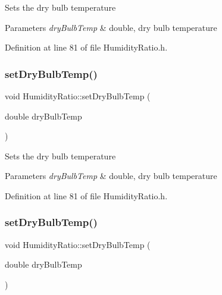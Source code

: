 Sets the dry bulb temperature


\begin{DoxyParams}{Parameters}
{\em dry\+Bulb\+Temp} & double, dry bulb temperature \\
\hline
\end{DoxyParams}


Definition at line 81 of file Humidity\+Ratio.\+h.

\mbox{\label{class_humidity_ratio_a291bccce6b8665412987a31bd2633d9a}} 
\subsubsection{\texorpdfstring{set\+Dry\+Bulb\+Temp()}{setDryBulbTemp()}\hspace{0.1cm}{\footnotesize\ttfamily [2/3]}}
{\footnotesize\ttfamily void Humidity\+Ratio\+::set\+Dry\+Bulb\+Temp (\begin{DoxyParamCaption}\item[{double}]{dry\+Bulb\+Temp }\end{DoxyParamCaption})\hspace{0.3cm}{\ttfamily [inline]}}

Sets the dry bulb temperature


\begin{DoxyParams}{Parameters}
{\em dry\+Bulb\+Temp} & double, dry bulb temperature \\
\hline
\end{DoxyParams}


Definition at line 81 of file Humidity\+Ratio.\+h.

\mbox{\label{class_humidity_ratio_a291bccce6b8665412987a31bd2633d9a}} 
\subsubsection{\texorpdfstring{set\+Dry\+Bulb\+Temp()}{setDryBulbTemp()}\hspace{0.1cm}{\footnotesize\ttfamily [3/3]}}
{\footnotesize\ttfamily void Humidity\+Ratio\+::set\+Dry\+Bulb\+Temp (\begin{DoxyParamCaption}\item[{double}]{dry\+Bulb\+Temp }\end{DoxyParamCaption})\hspace{0.3cm}{\ttfamily [inline]}}


